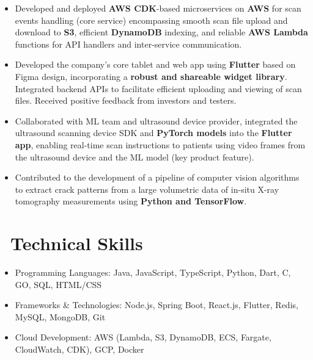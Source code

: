 \documentclass{resume}
\begin{document}
\begin{itemize}
\item Developed and deployed \textbf{AWS CDK}-based microservices on \textbf{AWS} for scan events handling (core service) encompassing smooth scan file upload and download to \textbf{S3}, efficient \textbf{DynamoDB} indexing, and reliable \textbf{AWS Lambda} functions for API handlers and inter-service communication.
\item Developed the company's core tablet and web app using \textbf{Flutter} based on Figma design, incorporating a \textbf{robust and shareable widget library}. Integrated backend APIs to facilitate efficient uploading and viewing of scan files. Received positive feedback from investors and testers.
\item Collaborated with ML team and ultrasound device provider, integrated the ultrasound scanning device SDK and \textbf{PyTorch models} into the \textbf{Flutter app}, enabling real-time scan instructions to patients using video frames from the ultrasound device and the ML model (key product feature).
\end{itemize}

\begin{itemize}
\item Contributed to the development of a pipeline of computer vision algorithms to extract crack patterns from a large volumetric data of in-situ X-ray tomography measurements using \textbf{Python and TensorFlow}.
\end{itemize}



\section{\faCogs\ Technical Skills} 
\begin{itemize}[parsep=0.5ex]
  \item Programming Languages: Java, JavaScript, TypeScript, Python, Dart, C, GO, SQL, HTML/CSS
  \item Frameworks \& Technologies: Node.js, Spring Boot, React.js, Flutter, Redis, MySQL, MongoDB, Git
  \item Cloud Development: AWS (Lambda, S3, DynamoDB, ECS, Fargate, CloudWatch, CDK), GCP, Docker
\end{itemize}
 

%
%
\end{document}
